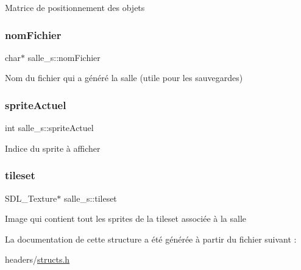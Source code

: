 Matrice de positionnement des objets \mbox{\label{structsalle__s_a12e47589795f5ed60109cf2b073ec671}} 
\subsubsection{\texorpdfstring{nom\+Fichier}{nomFichier}}
{\footnotesize\ttfamily char$\ast$ salle\+\_\+s\+::nom\+Fichier}

Nom du fichier qui a généré la salle (utile pour les sauvegardes) \mbox{\label{structsalle__s_a0305fc652ff8d07decc455bfc34ea595}} 
\subsubsection{\texorpdfstring{sprite\+Actuel}{spriteActuel}}
{\footnotesize\ttfamily int salle\+\_\+s\+::sprite\+Actuel}

Indice du sprite à afficher \mbox{\label{structsalle__s_a44a7c08d109019af0e4877e488cef708}} 
\subsubsection{\texorpdfstring{tileset}{tileset}}
{\footnotesize\ttfamily S\+D\+L\+\_\+\+Texture$\ast$ salle\+\_\+s\+::tileset}

Image qui contient tout les sprites de la tileset associée à la salle 

La documentation de cette structure a été générée à partir du fichier suivant \+:\begin{DoxyCompactItemize}
\item 
headers/\hyperlink{structs_8h}{structs.\+h}\end{DoxyCompactItemize}

